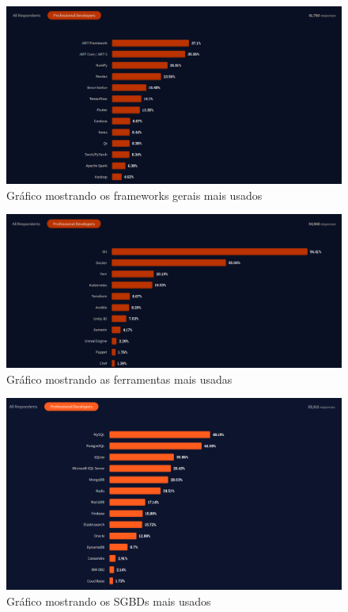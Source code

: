 \documentclass[12pt]{article}
\begin{document}
\begin{figure}[H]
  \centering
  \includegraphics[width=1\textwidth]{stackoverflow/general_framework_usage.png}
  \caption{Gráfico mostrando os frameworks gerais mais usados}\label{fig:general-frameworks}
\end{figure}

\begin{figure}[H]
  \centering
  \includegraphics[width=1\textwidth]{stackoverflow/used_tools.png}
  \caption{Gráfico mostrando as ferramentas mais usadas}\label{fig:tools}
\end{figure}

\begin{figure}[H]
  \centering
  \includegraphics[width=1\textwidth]{stackoverflow/databases.png}
  \caption{Gráfico mostrando os SGBDs mais usados}\label{fig:databases}
\end{figure}
\end{document}
